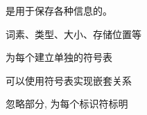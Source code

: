 
\begin{frame}{}
  \begin{center}
    \begin{definition}
      是用于保存各种信息的。
    \end{definition}

    \vspace{0.50cm}
     词素、类型、大小、存储位置等

    \pause
  \end{center}
\end{frame}

\begin{frame}{}
  \begin{center}
    为每个建立单独的符号表


    可以使用符号表实现嵌套关系
  \end{center}
\end{frame}

\begin{frame}{}
  \begin{center}
  \end{center}
\end{frame}

\begin{frame}{}
  \begin{center}

    \pause
    \vspace{0.80cm}
     忽略部分, 为每个标识符标明

    \vspace{0.80cm}
  \end{center}
\end{frame}

